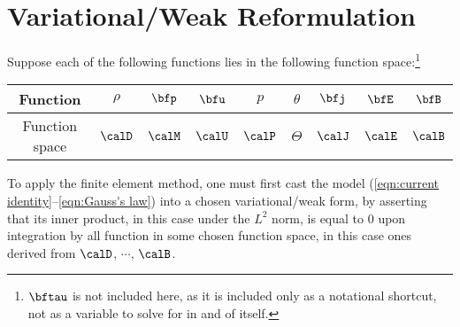 \section{Variational/Weak Reformulation}

    Suppose each of the following functions lies in the following function space:\footnote{$\bftau$ is not included here, as it is included only as a notational shortcut, not as a variable to solve for in and of itself.} 
    \begin{center}\begin{tabular}{ c || c : c c : c c | c | c c }
        Function  &  $\rho$  &  $\bfp$  &  $\bfu$  &  $p$  &  $\theta$ 
         &  $\bfj$  &  $\bfE$  &  $\bfB$  \\
        \hline
        Function space  &  $\calD$  &  $\calM$  &  $\calU$  &  $\calP$  &  $\Theta$  &  $\calJ$  &  $\calE$  &  $\calB$  \\
    \end{tabular}\end{center}
    
    To apply the finite element method, one must first cast the model (\ref{eqn:current identity}–\ref{eqn:Gauss's law}) into a chosen variational/weak form, by asserting that its inner product, in this case under the $L^{2}$ norm, is equal to $0$ upon integration by all function in some chosen function space, in this case ones derived from $\calD$, $\cdots$, $\calB$.


    
    
    
